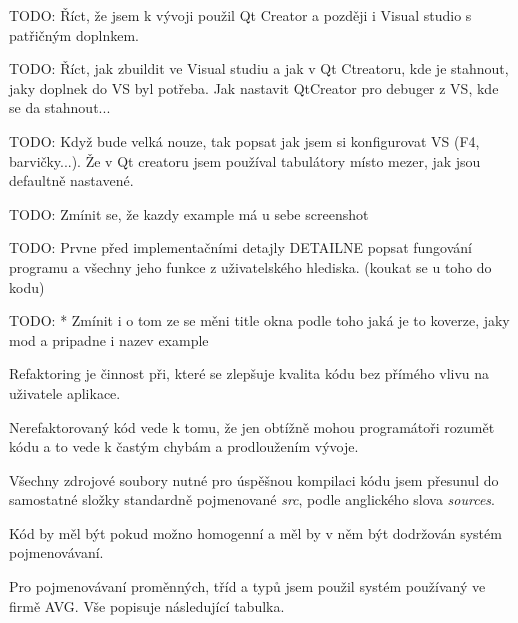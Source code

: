 
TODO: Říct, že jsem k vývoji použil Qt Creator a později i Visual studio s patřičným doplnkem.

TODO: Říct, jak zbuildit ve Visual studiu a jak v Qt Ctreatoru, kde je stahnout, jaky doplnek do VS byl potřeba. Jak nastavit QtCreator pro debuger z VS, kde se da stahnout...

TODO: Když bude velká nouze, tak popsat jak jsem si konfigurovat VS (F4, barvičky...). Že v Qt creatoru jsem používal tabulátory místo mezer, jak jsou defaultně nastavené.

TODO: Zmínit se, že kazdy example má u sebe screenshot

TODO: Prvne před implementačními detajly DETAILNE popsat fungování programu a všechny jeho funkce z uživatelského hlediska. (koukat se u toho do kodu)

TODO: * Zmínit i o tom ze se měni title okna podle toho jaká je to koverze, jaky mod a pripadne i nazev example


Refaktoring je činnost při, které se zlepšuje kvalita kódu bez přímého vlivu na uživatele aplikace.

Nerefaktorovaný kód vede k tomu, že jen obtížně mohou programátoři rozumět kódu a to vede k častým chybám a prodloužením vývoje.

Všechny zdrojové soubory nutné pro úspěšnou kompilaci kódu jsem přesunul do samostatné složky standardně pojmenované \textit{src}, podle anglického slova \textit{sources}.

Kód by měl být pokud možno homogenní a měl by v něm být dodržován systém pojmenovávaní. 


Pro pojmenovávaní proměnných, tříd a typů jsem použil systém používaný ve firmě AVG.
Vše popisuje následující tabulka.



